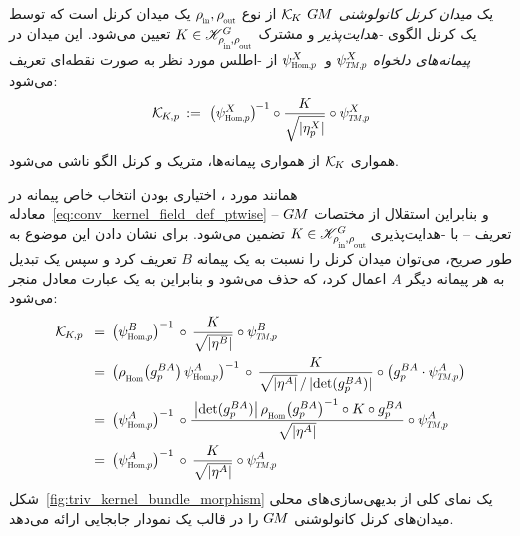 \begin{dfn}
\label{dfn:conv_kernel_field}
    یک \emph{میدان کرنل کانولوشنی $G\mkern-1.4muM$} $\mathcal{K}_{\mkern-2mu K}$ از نوع $\rhoin,\rhoout$ یک میدان کرنل است که توسط یک کرنل الگوی \emph{-هدایت‌پذیر} و مشترک $K \in \KG$ تعیین می‌شود.
    این میدان در \emph{پیمانه‌های دلخواه} $\psiTMp^X$ و $\psiHomp^X\,$ از -اطلس مورد نظر به صورت نقطه‌ای تعریف می‌شود:
    \begin{align}\label{eq:conv_kernel_field_def_ptwise}
        \KKp \,:=\ \big(\psiHomp^X\big)^{\mkern-2mu-1} \circ \frac{K}{\sqrt{|\eta_p^X|}} \circ \psiTMp^X
    \end{align}
    همواری $\mathcal{K}_{\mkern-2mu K}$ از همواری پیمانه‌ها، متریک و کرنل الگو ناشی می‌شود.
\end{dfn}
همانند مورد \onexoneGMs، اختیاری بودن انتخاب خاص پیمانه در معادله~\eqref{eq:conv_kernel_field_def_ptwise} -- و بنابراین استقلال از مختصات $G\mkern-1.4muM$ تعریف -- با -هدایت‌پذیری $K\in\KG\!$ تضمین می‌شود.
برای نشان دادن این موضوع به طور صریح، می‌توان میدان کرنل را نسبت به یک پیمانه $B$ تعریف کرد و سپس یک تبدیل به هر پیمانه دیگر $A$ اعمال کرد، که حذف می‌شود و بنابراین به یک عبارت معادل منجر می‌شود:
\begin{align}\label{eq:arbitrariness_gauge_GM_kernel_field_def}
    \KKp
    \,\ =&\,\ \big(\psiHomp^B \big)^{-1} \,\circ \,\frac{K}{\sqrt{|\eta^B|}} \circ \psiTMp^B \notag \\
    \,\ =&\,\ \big( \rhoHom\big(g_p^{BA}\big)\, \psiHomp^A \big)^{-1} \,\circ \,\frac{K}{\sqrt{|\eta^A|} \,/\, |\! \det(g_p^{BA})| } \circ \big( g_p^{BA}\cdot \psiTMp^A \big) \notag \\
    \,\ =&\,\ \big(\psiHomp^A \big)^{-1} \,\circ \frac{\,\big|\! \det(g_p^{BA})\big|\, \rhoHom\big(g_p^{BA}\big)^{-1} \circ K \circ g_p^{BA}}{\sqrt{|\eta^A|}} \circ \psiTMp^A \notag \\
    \,\ =&\,\ \big(\psiHomp^A \big)^{-1} \,\circ \,\frac{K}{\sqrt{|\eta^A|}} \circ \psiTMp^A
\end{align}
شکل~\ref{fig:triv_kernel_bundle_morphism} یک نمای کلی از بدیهی‌سازی‌های محلی میدان‌های کرنل کانولوشنی $G\mkern-1.4muM$ را در قالب یک نمودار جابجایی ارائه می‌دهد.

